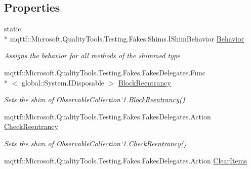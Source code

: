 \subsection*{Properties}
\begin{DoxyCompactItemize}
\item 
static \\*
mqttf\-::\-Microsoft.\-Quality\-Tools.\-Testing.\-Fakes.\-Shims.\-I\-Shim\-Behavior \hyperlink{class_system_1_1_collections_1_1_object_model_1_1_fakes_1_1_shim_observable_collection_3_01_t_01_4_afce49aa1457d6b69acbe1c2000bd9c70}{Behavior}
\begin{DoxyCompactList}\small\item\em Assigns the behavior for all methods of the shimmed type\end{DoxyCompactList}\item 
mqttf\-::\-Microsoft.\-Quality\-Tools.\-Testing.\-Fakes.\-Fakes\-Delegates.\-Func\\*
$<$ global\-::\-System.\-I\-Disposable $>$ \hyperlink{class_system_1_1_collections_1_1_object_model_1_1_fakes_1_1_shim_observable_collection_3_01_t_01_4_a695262d5aa2568068d76a183f739a9d4}{Block\-Reentrancy}
\begin{DoxyCompactList}\small\item\em Sets the shim of Observable\-Collection`1.\hyperlink{class_system_1_1_collections_1_1_object_model_1_1_fakes_1_1_shim_observable_collection_3_01_t_01_4_a695262d5aa2568068d76a183f739a9d4}{Block\-Reentrancy()}\end{DoxyCompactList}\item 
mqttf\-::\-Microsoft.\-Quality\-Tools.\-Testing.\-Fakes.\-Fakes\-Delegates.\-Action \hyperlink{class_system_1_1_collections_1_1_object_model_1_1_fakes_1_1_shim_observable_collection_3_01_t_01_4_a13b074e6cd9cd946e8fd03e48ad31228}{Check\-Reentrancy}
\begin{DoxyCompactList}\small\item\em Sets the shim of Observable\-Collection`1.\hyperlink{class_system_1_1_collections_1_1_object_model_1_1_fakes_1_1_shim_observable_collection_3_01_t_01_4_a13b074e6cd9cd946e8fd03e48ad31228}{Check\-Reentrancy()}\end{DoxyCompactList}\item 
mqttf\-::\-Microsoft.\-Quality\-Tools.\-Testing.\-Fakes.\-Fakes\-Delegates.\-Action \hyperlink{class_system_1_1_collections_1_1_object_model_1_1_fakes_1_1_shim_observable_collection_3_01_t_01_4_a84f08ed60776f5ac62c86d96b7287ba4}{Clear\-Items}

\end{DoxyCompactItemize}
